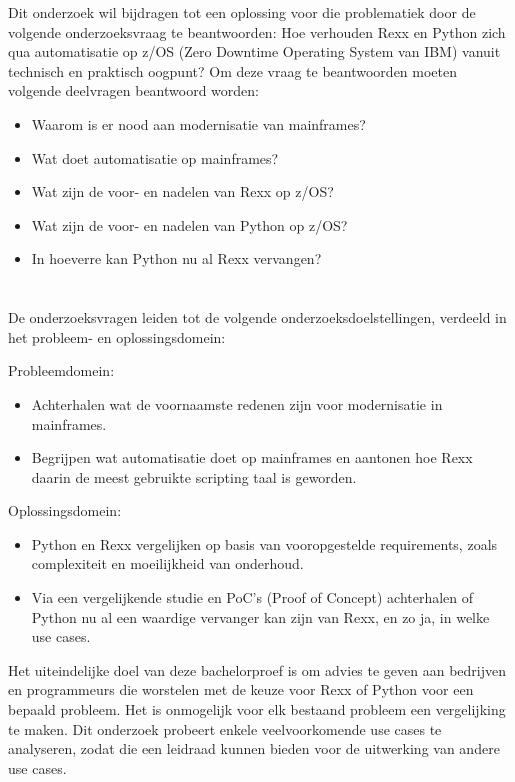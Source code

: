 Dit onderzoek wil bijdragen tot een oplossing voor die problematiek door de volgende onderzoeksvraag te beantwoorden: Hoe verhouden Rexx en Python zich qua automatisatie op z/OS (Zero Downtime Operating System van IBM) vanuit technisch en praktisch oogpunt? 
Om deze vraag te beantwoorden moeten volgende deelvragen beantwoord worden:

\begin{itemize}
    \item Waarom is er nood aan modernisatie van mainframes?
    \item Wat doet automatisatie op mainframes?
    \item Wat zijn de voor- en nadelen van Rexx op z/OS?
    \item Wat zijn de voor- en nadelen van Python op z/OS?
    \item In hoeverre kan Python nu al Rexx vervangen?
\end{itemize}


\section{}%
\label{sec:onderzoeksdoelstelling}

De onderzoeksvragen leiden tot de volgende onderzoeksdoelstellingen, verdeeld in het probleem- en oplossingsdomein:

Probleemdomein:
\begin{itemize}
    \item Achterhalen wat de voornaamste redenen zijn voor modernisatie in mainframes.
    \item Begrijpen wat automatisatie doet op mainframes en aantonen hoe Rexx daarin de meest gebruikte scripting taal is geworden.
\end{itemize}

Oplossingsdomein:
\begin{itemize}
    \item Python en Rexx vergelijken op basis van vooropgestelde requirements, zoals complexiteit en moeilijkheid van onderhoud.
    \item Via een vergelijkende studie en PoC's (Proof of Concept) achterhalen of Python nu al een waardige vervanger kan zijn van Rexx, en zo ja, in welke use cases.
\end{itemize}

Het uiteindelijke doel van deze bachelorproef is om advies te geven aan bedrijven en programmeurs die worstelen met de keuze voor Rexx of Python voor een bepaald probleem. Het is onmogelijk voor elk bestaand probleem een vergelijking te maken. Dit onderzoek probeert enkele veelvoorkomende use cases te analyseren, zodat die een leidraad kunnen bieden voor de uitwerking van andere use cases.


